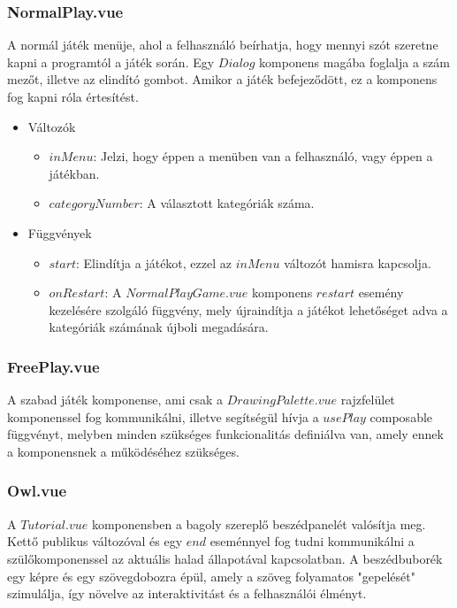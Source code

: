 \subsubsection{NormalPlay.vue}
A normál játék menüje, ahol a felhasználó beírhatja, hogy mennyi szót szeretne kapni a programtól a játék során. Egy $Dialog$ komponens magába foglalja a szám mezőt, illetve az elindító gombot. Amikor a játék befejeződött, ez a komponens fog kapni róla értesítést.
\begin{itemize}
    \item Változók
    \begin{itemize}
        \item $inMenu$: Jelzi, hogy éppen a menüben van a felhasználó, vagy éppen a játékban.
        \item $categoryNumber$: A választott kategóriák száma.
    \end{itemize}
    \item Függvények
    \begin{itemize}
        \item $start$: Elindítja a játékot, ezzel az $inMenu$ változót hamisra kapcsolja.
        \item $onRestart$: A $NormalPlayGame.vue$ komponens $restart$ esemény kezelésére szolgáló függvény, mely újraindítja a játékot lehetőséget adva a kategóriák számának újboli megadására.
    \end{itemize}
\end{itemize}

\subsubsection{FreePlay.vue}
A szabad játék komponense, ami csak a $DrawingPalette.vue$ rajzfelület komponenssel fog kommunikálni, illetve segítségül hívja a $usePlay$ composable függvényt, melyben minden szükséges funkcionalitás definiálva van, amely ennek a komponensnek a működéséhez szükséges.

\subsubsection{Owl.vue}
A $Tutorial.vue$ komponensben a bagoly szereplő beszédpanelét valósítja meg. Kettő publikus változóval és egy $end$ eseménnyel fog tudni kommunikálni a szülőkomponenssel az aktuális halad állapotával kapcsolatban. A beszédbuborék egy képre és egy szövegdobozra épül, amely a szöveg folyamatos "gepelését" szimulálja, így növelve az interaktivitást és a felhasználói élményt.

